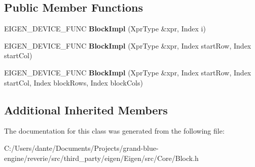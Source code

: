 \subsection*{Public Member Functions}
\begin{DoxyCompactItemize}
\item 
\mbox{\label{class_eigen_1_1_block_impl_3_01_xpr_type_00_01_block_rows_00_01_block_cols_00_01_inner_panel_00_01_dense_01_4_a20e4e2375b0d79b6820e05d481f17a9a}} 
E\+I\+G\+E\+N\+\_\+\+D\+E\+V\+I\+C\+E\+\_\+\+F\+U\+NC {\bfseries Block\+Impl} (Xpr\+Type \&xpr, Index i)
\item 
\mbox{\label{class_eigen_1_1_block_impl_3_01_xpr_type_00_01_block_rows_00_01_block_cols_00_01_inner_panel_00_01_dense_01_4_a085388c41a4b03b1817ffb0c465c0433}} 
E\+I\+G\+E\+N\+\_\+\+D\+E\+V\+I\+C\+E\+\_\+\+F\+U\+NC {\bfseries Block\+Impl} (Xpr\+Type \&xpr, Index start\+Row, Index start\+Col)
\item 
\mbox{\label{class_eigen_1_1_block_impl_3_01_xpr_type_00_01_block_rows_00_01_block_cols_00_01_inner_panel_00_01_dense_01_4_abdea47b9ce5c0674cf046777e5769cc4}} 
E\+I\+G\+E\+N\+\_\+\+D\+E\+V\+I\+C\+E\+\_\+\+F\+U\+NC {\bfseries Block\+Impl} (Xpr\+Type \&xpr, Index start\+Row, Index start\+Col, Index block\+Rows, Index block\+Cols)
\end{DoxyCompactItemize}
\subsection*{Additional Inherited Members}


The documentation for this class was generated from the following file\+:\begin{DoxyCompactItemize}
\item 
C\+:/\+Users/dante/\+Documents/\+Projects/grand-\/blue-\/engine/reverie/src/third\+\_\+party/eigen/\+Eigen/src/\+Core/Block.\+h\end{DoxyCompactItemize}
